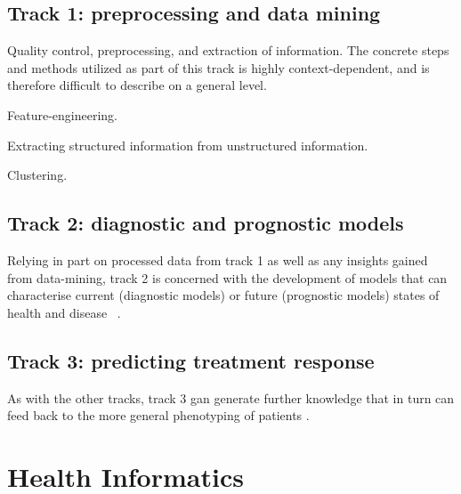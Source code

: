 \subsection{Track 1: preprocessing and data mining}

Quality control, preprocessing, and extraction of information.
The concrete steps and methods utilized as part of this track
is highly context-dependent, 
and is therefore difficult to describe on a general level. 

Feature-engineering.

Extracting structured information from unstructured information.

Clustering.

\subsection{Track 2: diagnostic and prognostic models}

Relying in part on processed data from track 1
as well as any insights gained from data-mining,
track 2 is concerned with the development
of models that can characterise current (diagnostic models)
or future (prognostic models) states of health and disease~%
\autocite{konigWhat2017}. 

\subsection{Track 3: predicting treatment response}


As with the other tracks, track 3 gan generate further knowledge 
that in turn can feed back to the more general phenotyping of patients
\autocite{konigWhat2017}. 


\section{Health Informatics}

